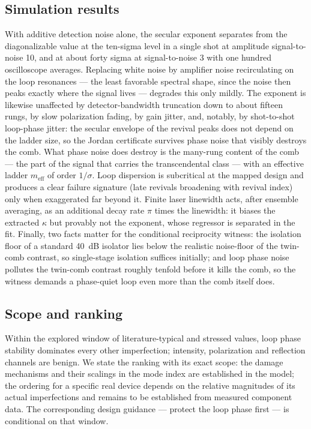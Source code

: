 \documentclass[11pt,a4paper]{article}
\begin{document}
\subsection{Simulation results}

With additive detection noise alone, the secular exponent separates from the
diagonalizable value at the ten-sigma level in a single shot at amplitude
signal-to-noise 10, and at about forty sigma at signal-to-noise 3 with one
hundred oscilloscope averages. Replacing white noise by amplifier noise
recirculating on the loop resonances --- the least favorable spectral shape,
since the noise then peaks exactly where the signal lives --- degrades this
only mildly. The exponent is likewise unaffected by detector-bandwidth
truncation down to about fifteen rungs, by slow polarization fading, by gain
jitter, and, notably, by shot-to-shot loop-phase jitter: the secular envelope
of the revival peaks does not depend on the ladder size, so the Jordan
certificate survives phase noise that visibly destroys the comb. What phase
noise does destroy is the many-rung content of the comb --- the part of the
signal that carries the transcendental class --- with an effective ladder
$m_{\mathrm{eff}}$ of order $1/\sigma$. Loop dispersion is subcritical at the
mapped design and produces a clear failure signature (late revivals broadening
with revival index) only when exaggerated far beyond it. Finite laser linewidth
acts, after ensemble averaging, as an additional decay rate $\pi$ times the
linewidth: it biases the extracted $\kappa$ but provably not the exponent,
whose regressor is separated in the fit. Finally, two facts matter for the
conditional reciprocity witness: the isolation floor of a standard 40~dB
isolator lies below the realistic noise-floor of the twin-comb contrast, so
single-stage isolation suffices initially; and loop phase noise pollutes the
twin-comb contrast roughly tenfold before it kills the comb, so the witness
demands a phase-quiet loop even more than the comb itself does.

\subsection{Scope and ranking}

Within the explored window of literature-typical and stressed values, loop
phase stability dominates every other imperfection; intensity, polarization and
reflection channels are benign. We state the ranking with its exact scope: the
damage mechanisms and their scalings in the mode index are established in the
model; the ordering for a specific real device depends on the relative
magnitudes of its actual imperfections and remains to be established from
measured component data. The corresponding design guidance --- protect the loop
phase first --- is conditional on that window.
\end{document}
